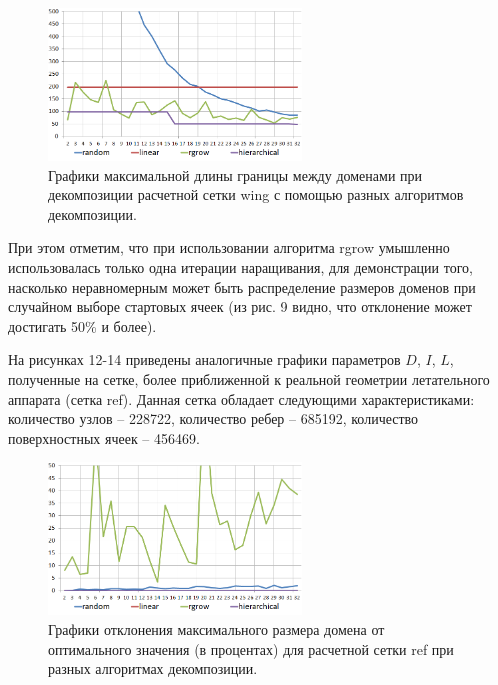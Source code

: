 \begin{figure}[ht]
	\centering
		\includegraphics[width=0.6\textwidth]{./pics/text_2_decompsurf/wing_50_max_border.png}
	\caption{Графики максимальной длины границы между доменами при декомпозиции расчетной сетки wing с помощью разных алгоритмов декомпозиции.}
	\label{fig:text_2_decompsurf_wing_50_max_border}
\end{figure}

При этом отметим, что при использовании алгоритма rgrow умышленно использовалась только одна итерации наращивания, для демонстрации того, насколько неравномерным может быть распределение размеров доменов при случайном выборе стартовых ячеек (из рис. 9 видно, что отклонение может достигать 50\% и более).

На рисунках 12-14 приведены аналогичные графики параметров $D$, $I$, $L$, полученные на сетке, более приближенной к реальной геометрии летательного аппарата (сетка ref). Данная сетка обладает следующими характеристиками: количество узлов -- 228722, количество ребер -- 685192, количество поверхностных ячеек -- 456469.

\begin{figure}[ht]
	\centering
		\includegraphics[width=0.6\textwidth]{./pics/text_2_decompsurf/air_inlet_blocks_dev.png}
	\caption{Графики отклонения максимального размера домена от оптимального значения (в процентах) для расчетной сетки ref при разных алгоритмах декомпозиции.}
	\label{fig:text_2_decompsurf_air_inlet_blocks_dev}
\end{figure}

